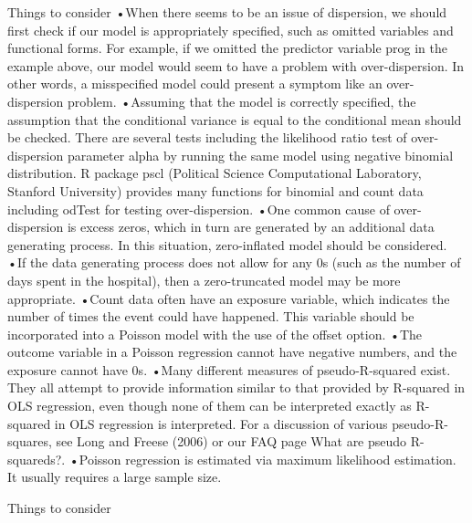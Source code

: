 

Things to consider
 •When there seems to be an issue of dispersion, we should first check if our model is appropriately specified, such as omitted variables and functional forms. For example, if we omitted the predictor variable prog in the example above, our model would seem to have a problem with over-dispersion. In other words, a misspecified model could present a symptom like an over-dispersion problem. 
•Assuming that the model is correctly specified, the assumption that the conditional variance is equal to the conditional mean should be checked. There are several tests including the likelihood ratio test of over-dispersion parameter alpha by running the same model using negative binomial distribution. R package pscl (Political Science Computational Laboratory, Stanford University) provides many functions for binomial and count data including odTest for testing over-dispersion. 
•One common cause of over-dispersion is excess zeros, which in turn are generated by an additional data generating process. In this situation, zero-inflated model should be considered.
•If the data generating process does not allow for any 0s (such as the number of days spent in the hospital), then a zero-truncated model may be more appropriate.
•Count data often have an exposure variable, which indicates the number of times the event could have happened. This variable should be incorporated into a Poisson model with the use of the offset option.
•The outcome variable in a Poisson regression cannot have negative numbers, and the exposure cannot have 0s.
•Many different measures of pseudo-R-squared exist. They all attempt to provide information similar to that provided by R-squared in OLS regression, even though none of them can be interpreted exactly as R-squared in OLS regression is interpreted. For a discussion of various pseudo-R-squares, see Long and Freese (2006) or our FAQ page What are pseudo R-squareds?.
•Poisson regression is estimated via maximum likelihood estimation. It usually requires a large sample size. 




Things to consider
 

